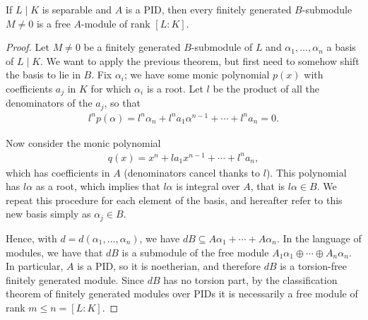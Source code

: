 \begin{prop}
	If $L\mid K$ is separable and $A$ is a PID, then every finitely generated $B$-submodule $M\neq 0$ is a free $A$-module of rank $[L:K]$.
\end{prop}
\begin{proof}
	Let $M\neq 0$ be a finitely generated $B$-submodule of $L$ and $\alpha_1,\dots,\alpha_n$ a basis of $L\mid K$. We want to apply the previous theorem, but first need to somehow shift the basis to lie in $B$. Fix $\alpha_i$; we have some monic polynomial $p(x)$ with coefficients $a_j$ in $K$ for which $\alpha_i$ is a root. Let $l$ be the product of all the denominators of the $a_j$, so that
	\begin{align*}
		l^n p(\alpha) = l^n \alpha_n + l^n a_1 \alpha^{n-1} + \cdots + l^n a_n = 0.
	\end{align*}

	Now consider the monic polynomial
	\begin{align*}
		q(x) = x^n + l a_1 x^{n-1} + \cdots + l^n a_n,
	\end{align*}
	which has coefficients in $A$ (denominators cancel thanks to $l$). This polynomial has $l\alpha$ as a root, which implies that $l\alpha$ is integral over $A$, that is $l\alpha\in B$. We repeat this procedure for each element of the basis, and hereafter refer to this new basis simply as $\alpha_j\in B$.

	Hence, with $d=d(\alpha_1,\dots,\alpha_n)$, we have $dB\subseteq A\alpha_1+\cdots+A\alpha_n$. In the language of modules, we have that $dB$ is a submodule of the free module $A_1\alpha_1\oplus\cdots\oplus A_n\alpha_n$. In particular, $A$ is a PID, so it is noetherian, and therefore $dB$ is a torsion-free finitely generated module. Since $dB$ has no torsion part, by the classification theorem of finitely generated modules over PIDs it is necessarily a free module of rank $m \leq n = [L:K]$.


\end{proof}
